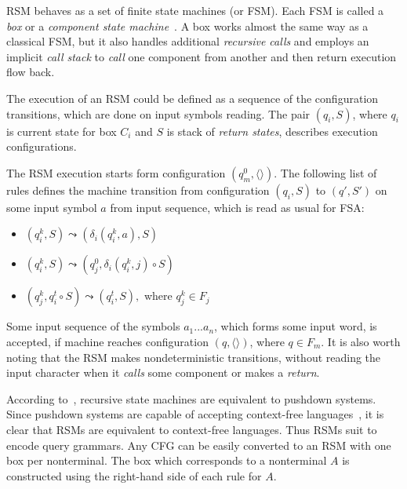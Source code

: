 RSM behaves as a set of finite state machines (or FSM).
Each FSM is called a \textit{box} or a \textit{component state machine}~\cite{rsm:analysis:10.1007/3-540-44585-4_18}.
A box works almost the same way as a classical FSM, but it also handles additional \textit{recursive calls} and employs an implicit \textit{call stack} to \textit{call} one component from another and then return execution flow back.

The execution of an RSM could be defined as a sequence of the configuration transitions, which are done on input symbols reading. 
The pair $(q_i,S)$, where $q_i$ is current state for box $C_i$ and $S$ is stack of \textit{return states}, describes execution configurations. 

The RSM execution starts form configuration $(q_m^0, \langle\rangle)$. 
The following list of rules defines the machine transition from configuration $(q_i,S)$ to $(q',S')$ on some input symbol $a$ from input sequence, which is read as usual for FSA:

\begin{itemize}
    \item $(q_i^k,S) \leadsto (\delta_i (q_i^k, a),S)$
    \item $(q_i^k,S) \leadsto (q_j^0, \delta_i (q_i^k, j) \circ S)$
    \item $(q_j^k,q_i^t\circ S) \leadsto (q_i^t, S),$ where $q_j^k \in F_j$ 
\end{itemize}

Some input sequence of the symbols $a_1 ... a_n$, which forms some input word, is accepted, if machine reaches configuration $(q,\langle\rangle)$, where $q \in F_m$. It is also worth noting that the  RSM makes nondeterministic transitions, without reading the input character when it \textit{calls} some component or  makes a \textit{return}.

According to~\cite{rsm:analysis:10.1007/3-540-44585-4_18}, recursive state machines are equivalent to pushdown systems.
Since pushdown systems are capable of accepting context-free languages~\cite{automata:theory:10.5555/1177300}, it is clear that RSMs are equivalent to context-free languages.
Thus RSMs suit to encode query grammars.
Any CFG can be easily converted to an RSM with one box per nonterminal.
The box which corresponds to a nonterminal $A$ is constructed using the right-hand side of each rule for $A$.

